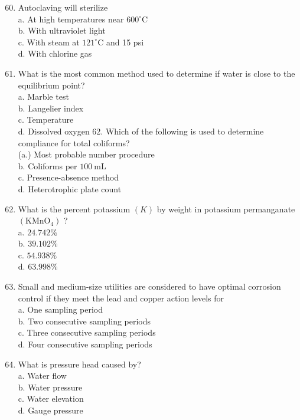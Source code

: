 \documentclass[10pt]{article}
\begin{document}
\begin{enumerate}
  \setcounter{enumi}{59}
  \item Autoclaving will sterilize\\
a. At high temperatures near $600^{\circ} \mathrm{C}$\\
b. With ultraviolet light\\
c. With steam at $121^{\circ} \mathrm{C}$ and 15 psi\\
d. With chlorine gas

  \item What is the most common method used to determine if water is close to the equilibrium point?\\
a. Marble test\\
b. Langelier index\\
c. Temperature\\
d. Dissolved oxygen 62. Which of the following is used to determine compliance for total coliforms?\\
(a.) Most probable number procedure\\
b. Coliforms per $100 \mathrm{~mL}$\\
c. Presence-absence method\\
d. Heterotrophic plate count

  \item What is the percent potassium $(K)$ by weight in potassium permanganate $\left(\mathrm{KMnO}_{4}\right)$ ?\\
a. $24.742 \%$\\
b. $39.102 \%$\\
c. $54.938 \%$\\
d. $63.998 \%$

  \item Small and medium-size utilities are considered to have optimal corrosion control if they meet the lead and copper action levels for\\
a. One sampling period\\
b. Two consecutive sampling periods\\
c. Three consecutive sampling periods\\
d. Four consecutive sampling periods

  \item What is pressure head caused by?\\
a. Water flow\\
b. Water pressure\\
c. Water elevation\\
d. Gauge pressure

\end{enumerate}
\end{document}
